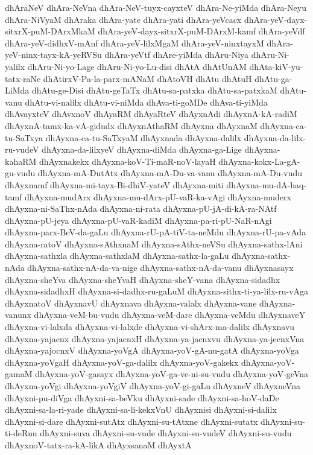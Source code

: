 {dhAraNeV
dhAra-NeVna
dhAra-NeV-tuyx-cayxteV
dhAra-Ne-yiMda
dhAra-Neyu
dhAra-NiVyaM
dhAraka
dhAra-yate
dhAra-yati
dhAra-yeVcacx
dhAra-yeV-dayx-sitxrX-puM-DArxMkaM
dhAra-yeV-dayx-sitxrX-puM-DArxM-kamf
dhAra-yeVdf
dhAra-yeV-didhxV-mAnf
dhAra-yeV-lilxMgaM
dhAra-yeV-ninxtayxM
dhAra-yeV-ninx-tayx-kA-yeRVSu
dhAra-yeVtf
dhAre-yiMda
dhAru-Niya
dhAru-Ni-yalilx
dhAru-Ni-yo-Lage
dhAru-Ni-yo-Lu-disi
dhAtA
dhAtUnAM
dhAta-kiV-yu-tatx-raNe
dhAtirxV-Pa-la-parx-mANaM
dhAtoVH
dhAtu
dhAtuH
dhAtu-ga-LiMda
dhAtu-ge-Disi
dhAtu-geTaTx
dhAtu-sa-patxka
dhAtu-sa-patxkaM
dhAtu-vanu
dhAtu-vi-nalilx
dhAtu-vi-niMda
dhAva-ti-goMDe
dhAva-ti-yiMda
dhAvayxteV
dhAvxnoV
dhAyaRM
dhAyaRteV
dhAyxnAdi
dhAyxnA-kA-radiM
dhAyxnA-tamx-ka-vA-gidudx
dhAyxnAthaRM
dhAyxna
dhAyxnaM
dhAyxna-ca-tu-SaTxya
dhAyxna-ca-tu-SaTxyaM
dhAyxnada
dhAyxna-dalilx
dhAyxna-da-lilx-ru-vudeV
dhAyxna-da-lilxyeV
dhAyxna-diMda
dhAyxna-ga-Lige
dhAyxna-kahaRM
dhAyxnakekx
dhAyxna-koV-Ti-maR-noV-layaH
dhAyxna-kokx-La-gA-gu-vudu
dhAyxna-mA-DutAtx
dhAyxna-mA-Du-va-vanu
dhAyxna-mA-Du-vudu
dhAyxnamf
dhAyxna-mi-tayx-Bi-dhiV-yateV
dhAyxna-miti
dhAyxna-mu-dA-haq-tamf
dhAyxna-mudArx
dhAyxna-mu-dArx-pU-vaR-ka-vAgi
dhAyxna-muderx
dhAyxna-ni-SaThx-nAda
dhAyxna-ni-rata
dhAyxna-pU-jA-di-kA-ra-NAtf
dhAyxna-pU-jeya
dhAyxna-pU-vaR-kadiM
dhAyxna-pa-ri-pU-NaR-nAgi
dhAyxna-parx-BeV-da-gaLu
dhAyxna-rU-pA-tiV-ta-neMdu
dhAyxna-rU-pa-vAda
dhAyxna-ratoV
dhAyxna-sAthxnaM
dhAyxna-sAthx-neVSu
dhAyxna-sathx-lAni
dhAyxna-sathxla
dhAyxna-sathxlaM
dhAyxna-sathx-la-gaLu
dhAyxna-sathx-nAda
dhAyxna-sathx-nA-da-va-nige
dhAyxna-sathx-nA-da-vanu
dhAyxnasayx
dhAyxna-sheYva
dhAyxna-sheYvaH
dhAyxna-sheY-vana
dhAyxna-sidadhx
dhAyxna-sidadhxH
dhAyxna-si-dadhx-ru-gaLuM
dhAyxna-sithx-ti-ya-lilx-ru-vAga
dhAyxnatoV
dhAyxnavU
dhAyxnava
dhAyxna-valalx
dhAyxna-vane
dhAyxna-vanunx
dhAyxna-veM-bu-vudu
dhAyxna-veM-dare
dhAyxna-veMdu
dhAyxnaveY
dhAyxna-vi-lalxda
dhAyxna-vi-lalxde
dhAyxna-vi-shArx-ma-dalilx
dhAyxnavu
dhAyxna-yajacnx
dhAyxna-yajacnxH
dhAyxna-ya-jacnxvu
dhAyxna-ya-jecnxVna
dhAyxna-yajocnxV
dhAyxna-yoVgA
dhAyxna-yoV-gA-nu-gatA
dhAyxna-yoVga
dhAyxna-yoVgaH
dhAyxna-yoV-ga-dalilx
dhAyxna-yoV-gakekx
dhAyxna-yoV-gamaM
dhAyxna-yoV-gasayx
dhAyxna-yoV-ga-ve-ni-su-vudu
dhAyxna-yoV-geVna
dhAyxna-yoVgi
dhAyxna-yoVgiV
dhAyxna-yoV-gi-gaLu
dhAyxneV
dhAyxneVna
dhAyxni-pu-diVga
dhAyxni-sa-beVku
dhAyxni-sade
dhAyxni-sa-hoV-daDe
dhAyxni-sa-la-ri-yade
dhAyxni-sa-li-kekxVnU
dhAyxnisi
dhAyxni-si-dalilx
dhAyxni-si-dare
dhAyxni-sutAtx
dhAyxni-su-tAtxne
dhAyxni-sutatx
dhAyxni-su-ti-deRnu
dhAyxni-suva
dhAyxni-su-vude
dhAyxni-su-vudeV
dhAyxni-su-vudu
dhAyxnoV-tatx-ra-kA-likA
dhAyxsanaM
dhAyxtA
}
